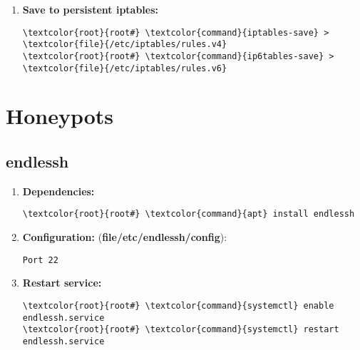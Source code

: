 \documentclass[10pt, a4paper, onecolumn, openany]{book} %
\begin{document}
\begin{enumerate}
\begin{itemize}
\begin{Verbatim}[commandchars=\\\{\}]
systemctl restart rsyslog.service
@daily systemctl restart logrotate.service && \char92
systemctl restart rsyslog.service
\end{Verbatim}
    \item \textbf{Restart rsyslog:}
\begin{Verbatim}[commandchars=\\\{\}]
\textcolor{root}{root#} \textcolor{command}{systemctl} restart logrotate.service &&
\textcolor{command}{systemctl} restart rsyslog.service
\end{Verbatim}    
New (exclusive) log file: (\textbf{\textcolor{file}{/var/log/iptables.log}}).
\end{itemize}
    \item \textbf{Save to persistent iptables:}
\begin{Verbatim}[commandchars=\\\{\}]
\textcolor{root}{root#} \textcolor{command}{iptables-save} > \textcolor{file}{/etc/iptables/rules.v4}
\textcolor{root}{root#} \textcolor{command}{ip6tables-save} > \textcolor{file}{/etc/iptables/rules.v6}
\end{Verbatim}
\end{enumerate}
\section{Honeypots}
\subsection{endlessh}
\begin{enumerate}
    \item \textbf{Dependencies:}
\begin{Verbatim}[commandchars=\\\{\}]
\textcolor{root}{root#} \textcolor{command}{apt} install endlessh
\end{Verbatim}    
    \item \textbf{Configuration:}
\newline (\textbf{\textbf{file}{/etc/endlessh/config}}):
\begin{Verbatim}[commandchars=\\\{\}]
Port 22
\end{Verbatim}
    \item \textbf{Restart service:}
\begin{Verbatim}[commandchars=\\\{\}]
\textcolor{root}{root#} \textcolor{command}{systemctl} enable endlessh.service
\textcolor{root}{root#} \textcolor{command}{systemctl} restart endlessh.service
\end{Verbatim}    
\end{enumerate}
\end{document}
